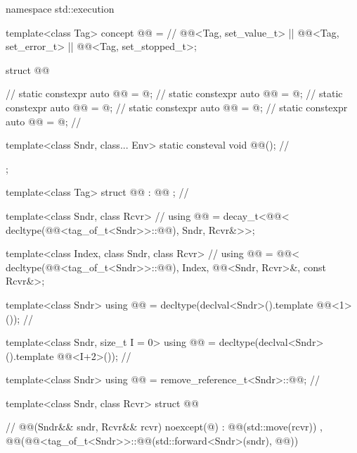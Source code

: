 \begin{codeblock}
namespace std::execution {
  template<class Tag>
  concept @@ =                                      // \expos
    @@<Tag, set_value_t> || @@<Tag, set_error_t> || @@<Tag, set_stopped_t>;

  struct @@ {                                        // \expos
    static constexpr auto @@ = @\seebelownc@;                // \expos
    static constexpr auto @@ = @\seebelownc@;                  // \expos
    static constexpr auto @@ = @\seebelownc@;                // \expos
    static constexpr auto @@ = @\seebelownc@;                    // \expos
    static constexpr auto @@ = @\seebelownc@;                 // \expos

    template<class Sndr, class... Env>
      static consteval void @@();                      // \expos
  };

  template<class Tag>
  struct @@ : @@ {};                          // \expos

  template<class Sndr, class Rcvr>                              // \expos
  using @@ = decay_t<@@<
    decltype(@@<tag_of_t<Sndr>>::@@), Sndr, Rcvr&>>;

  template<class Index, class Sndr, class Rcvr>                 // \expos
  using @@ = @@<
    decltype(@@<tag_of_t<Sndr>>::@@), Index,
    @@<Sndr, Rcvr>&, const Rcvr&>;

  template<class Sndr>
  using @@ = decltype(declval<Sndr>().template @@<1>());                // \expos

  template<class Sndr, size_t I = 0>
  using @@ = decltype(declval<Sndr>().template @@<I+2>());             // \expos

  template<class Sndr>
  using @@ = remove_reference_t<Sndr>::@@;                    // \expos

  template<class Sndr, class Rcvr>
  struct @@ {                                          // \expos
    @@(Sndr&& sndr, Rcvr&& rcvr) noexcept(@\seebelow@)
      : @@(std::move(rcvr))
      , @@(@@<tag_of_t<Sndr>>::@@(std::forward<Sndr>(sndr), @@)) { }

}}
\end{codeblock}
